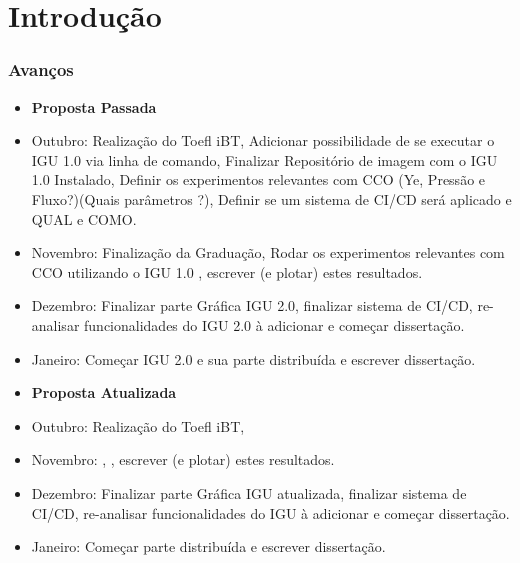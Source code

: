 \documentclass[10pt]{beamer}
\theoremstyle{remark}
\theoremstyle{definition}
\begin{document}
\section{Introdução}
\begin{frame}[allowframebreaks]
\frametitle{Avanços}
	
	\begin{itemize}
		\item \textbf{Proposta Passada}
		\item Outubro: Realização do Toefl iBT, Adicionar possibilidade de se executar o IGU 1.0 via linha de comando, Finalizar Repositório de imagem com o IGU 1.0 Instalado, Definir os experimentos relevantes com CCO (Ye, Pressão e Fluxo?)(Quais parâmetros ?), Definir se um sistema de CI/CD será aplicado e QUAL e COMO.
		
		\item Novembro: Finalização da Graduação, Rodar os experimentos relevantes com CCO utilizando o IGU 1.0 , escrever (e plotar) estes resultados.
		
		\item Dezembro: Finalizar parte Gráfica IGU 2.0, finalizar sistema de CI/CD, re-analisar funcionalidades do IGU 2.0 à adicionar e começar dissertação.
		
		\item Janeiro: Começar IGU 2.0 e sua parte distribuída e escrever dissertação.
		
	\end{itemize}
	
	
	\framebreak
	
	\begin{itemize}
		\item \textbf{Proposta Atualizada}
		\item Outubro: Realização do Toefl iBT, 
		
		\item Novembro:  ,  , escrever (e plotar) estes resultados.
		
		\item Dezembro: Finalizar parte Gráfica IGU atualizada, finalizar sistema de CI/CD, re-analisar funcionalidades do IGU à adicionar e começar dissertação.
		
		\item Janeiro: Começar parte distribuída e escrever dissertação.
		

\end{itemize}
\end{frame}
\end{document}
